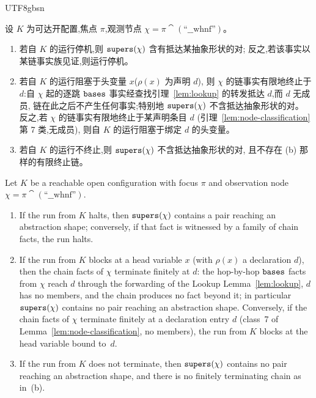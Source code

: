 \begin{CJK*}{UTF8}{gbsn}
\begin{lemma}\label{lem:open-simulation}
  \ifPaperChinese
  设 $K$ 为可达开配置,焦点 $\pi$,观测节点 $\chi = \pi \cat (\text{``\_\_whnf''})$。
  \begin{enumerate}
    \item[(a)] 若自 $K$ 的运行停机,则 $\mathtt{supers}(\chi)$ 含有抵达某抽象形状的对;
      反之,若该事实以某链事实族见证,则运行停机。
    \item[(b)] 若自 $K$ 的运行阻塞于头变量 $x$($\rho(x)$ 为声明 $d$),
      则 $\chi$ 的链事实有限地终止于 $d$:自 $\chi$ 起的逐跳 $\mathtt{bases}$
      事实经查找引理~\ref{lem:lookup} 的转发抵达 $d$,而 $d$ 无成员,
      链在此之后不产生任何事实;特别地 $\mathtt{supers}(\chi)$ 不含抵达抽象形状的对。
      反之,若 $\chi$ 的链事实有限地终止于某声明条目 $d$
      (引理~\ref{lem:node-classification} 第 7 类,无成员),
      则自 $K$ 的运行阻塞于绑定 $d$ 的头变量。
    \item[(c)] 若自 $K$ 的运行不终止,则 $\mathtt{supers}(\chi)$ 不含抵达抽象形状的对,
      且不存在 (b) 那样的有限终止链。
  \end{enumerate}
  \else
  Let $K$ be a reachable open configuration with focus $\pi$ and
  observation node $\chi = \pi \cat (\text{``\_\_whnf''})$.
  \begin{enumerate}
    \item[(a)] If the run from $K$ halts, then $\mathtt{supers}(\chi)$
      contains a pair reaching an abstraction shape; conversely, if
      that fact is witnessed by a family of chain facts, the run
      halts.
    \item[(b)] If the run from $K$ blocks at a head variable $x$
      (with $\rho(x)$ a declaration $d$), then the chain facts of
      $\chi$ terminate finitely at $d$: the hop-by-hop $\mathtt{bases}$ facts
      from $\chi$ reach $d$ through the forwarding of the Lookup
      Lemma~\ref{lem:lookup}, $d$ has no members, and the chain
      produces no fact beyond it; in particular $\mathtt{supers}(\chi)$
      contains no pair reaching an abstraction shape. Conversely, if
      the chain facts of $\chi$ terminate finitely at a declaration
      entry $d$ (class~7 of Lemma~\ref{lem:node-classification}, no
      members), the run from $K$ blocks at the head variable bound
      to~$d$.
    \item[(c)] If the run from $K$ does not terminate, then
      $\mathtt{supers}(\chi)$ contains no pair reaching an abstraction shape,
      and there is no finitely terminating chain as in~(b).
  \end{enumerate}
  \fi
\end{lemma}


\end{CJK*}
